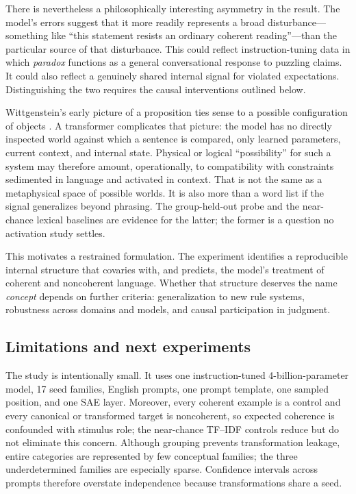 \documentclass[pdflatex,sn-nature]{sn-jnl}
\begin{document}
There is nevertheless a philosophically interesting asymmetry in the result. The model's errors suggest that it more readily represents a broad disturbance---something like ``this statement resists an ordinary coherent reading''---than the particular source of that disturbance. This could reflect instruction-tuning data in which \emph{paradox} functions as a general conversational response to puzzling claims. It could also reflect a genuinely shared internal signal for violated expectations. Distinguishing the two requires the causal interventions outlined below.

Wittgenstein's early picture of a proposition ties sense to a possible configuration of objects \cite{wittgenstein1922}. A transformer complicates that picture: the model has no directly inspected world against which a sentence is compared, only learned parameters, current context, and internal state. Physical or logical ``possibility'' for such a system may therefore amount, operationally, to compatibility with constraints sedimented in language and activated in context. That is not the same as a metaphysical space of possible worlds. It is also more than a word list if the signal generalizes beyond phrasing. The group-held-out probe and the near-chance lexical baselines are evidence for the latter; the former is a question no activation study settles.

This motivates a restrained formulation. The experiment identifies a reproducible internal structure that covaries with, and predicts, the model's treatment of coherent and noncoherent language. Whether that structure deserves the name \emph{concept} depends on further criteria: generalization to new rule systems, robustness across domains and models, and causal participation in judgment.

\subsection{Limitations and next experiments}

The study is intentionally small. It uses one instruction-tuned 4-billion-parameter model, 17 seed families, English prompts, one prompt template, one sampled position, and one SAE layer. Moreover, every coherent example is a control and every canonical or transformed target is noncoherent, so expected coherence is confounded with stimulus role; the near-chance TF--IDF controls reduce but do not eliminate this concern. Although grouping prevents transformation leakage, entire categories are represented by few conceptual families; the three underdetermined families are especially sparse. Confidence intervals across prompts therefore overstate independence because transformations share a seed.
\end{document}
